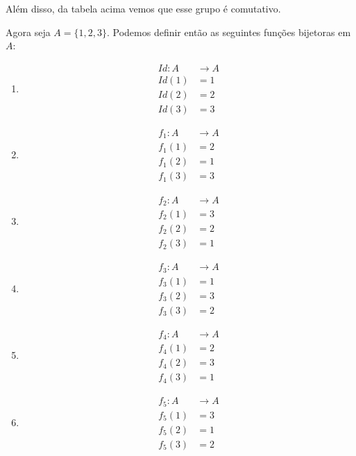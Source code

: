 Al\'em disso, da tabela acima vemos que esse grupo \'e comutativo.

Agora seja $A = \{1, 2, 3\}$. Podemos definir ent\~ao as seguintes fun\c{c}\~oes bijetoras em $A$:
\begin{multicols}{3}
    \begin{enumerate}
        \item[] \begin{align*}
            Id : A &\to A\\
            Id(1) &= 1\\
            Id(2) &= 2\\
            Id(3) &= 3
        \end{align*}
        \item[] \begin{align*}
            f_1 : A &\to A\\
            f_1(1) &= 2\\
            f_1(2) &= 1\\
            f_1(3) &= 3
        \end{align*}
        \item[] \begin{align*}
            f_2 : A &\to A\\
            f_2(1) &= 3\\
            f_2(2) &= 2\\
            f_2(3) &= 1
        \end{align*}
        \item[] \begin{align*}
            f_3 : A &\to A\\
            f_3(1) &= 1\\
            f_3(2) &= 3\\
            f_3(3) &= 2
        \end{align*}
        \item[] \begin{align*}
            f_4 : A &\to A\\
            f_4(1) &= 2\\
            f_4(2) &= 3\\
            f_4(3) &= 1
        \end{align*}
        \item[] \begin{align*}
            f_5 : A &\to A\\
            f_5(1) &= 3\\
            f_5(2) &= 1\\
            f_5(3) &= 2
        \end{align*}
    \end{enumerate}
\end{multicols}

